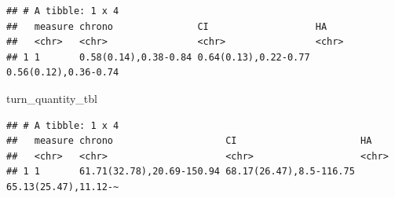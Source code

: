 \documentclass[
]{article}
\newenvironment{Shaded}{\begin{snugshade}}{\end{snugshade}}
\newcommand{\NormalTok}[1]{#1}
\begin{document}
\begin{verbatim}
## # A tibble: 1 x 4
##   measure chrono               CI                   HA                  
##   <chr>   <chr>                <chr>                <chr>               
## 1 1       0.58(0.14),0.38-0.84 0.64(0.13),0.22-0.77 0.56(0.12),0.36-0.74
\end{verbatim}

\begin{Shaded}
\begin{Highlighting}[]
\NormalTok{turn\_quantity\_tbl}
\end{Highlighting}
\end{Shaded}

\begin{verbatim}
## # A tibble: 1 x 4
##   measure chrono                    CI                      HA                  
##   <chr>   <chr>                     <chr>                   <chr>               
## 1 1       61.71(32.78),20.69-150.94 68.17(26.47),8.5-116.75 65.13(25.47),11.12-~
\end{verbatim}
\end{document}
